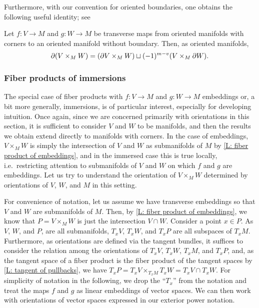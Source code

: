 Furthermore, with our convention for oriented boundaries, one obtains the following useful identity; see \cite[Propositions 7.4 and 7.5]{Joy12}

\begin{proposition}\label{P: oriented fiber boundary}
	Let $f \colon V \to M$ and $g \colon W \to M$ be transverse maps from oriented manifolds with corners to an oriented manifold without boundary.
	Then, as oriented manifolds,
	\begin{equation*}
		\partial (V \times_M W) = (\partial V \times_M W) \sqcup (-1)^{m-v}(V \times_M \partial W).
	\end{equation*}
\end{proposition}

\subsubsection{Fiber products of immersions}

The special case of fiber products with $f \colon V \to M$ and $g \colon W \to M$ embeddings or, a bit more generally, immersions, is of particular interest, especially for developing intuition.
Once again, since we are concerned primarily with orientations in this section, it is sufficient to consider $V$ and $W$ to be manifolds, and then the results we obtain extend directly to manifolds with corners.  
In the case of embeddings, $V \times_M W$ is simply the intersection of $V$ and $W$ as submanifolds of $M$ by \cref{L: fiber product of embeddings}, and in the immersed case this is true locally, i.e.\ restricting attention to submanifolds of $V$ and $W$ on which $f$ and $g$ are embeddings.
Let us try to understand the orientation of $V \times_M W$ determined by orientations of $V$, $W$, and $M$ in this setting.

For convenience of notation, let us assume we have transverse embeddings so that $V$ and $W$ are submanifolds of $M$. 
Then, by \cref{L: fiber product of embeddings}, we know that $P = V \times_M W$ is just the intersection $V \cap W$. 
Consider a point $x \in P$. 
As $V$, $W$, and $P$, are all submanifolds, $T_xV$, $T_xW$, and $T_xP$ are all subspaces of $T_xM$. Furthermore, as orientations are defined via the tangent bundles, it suffices to consider the relation among the orientations of $T_x V$, $T_xW$, $T_xM$, and $T_xP$, and, as the tangent space of a fiber product is the fiber product of the tangent spaces by \cref{L: tangent of pullbacks}, we have $T_xP = T_xV \times_{T_xM} T_xW = T_xV \cap T_xW$. 
For simplicity of notation in the following, we drop the ``$T_x$'' from the notation and treat the maps $f$ and $g$ as linear embeddings of vector spaces. 
We can then work with orientations of vector spaces expressed in our exterior power notation. 


